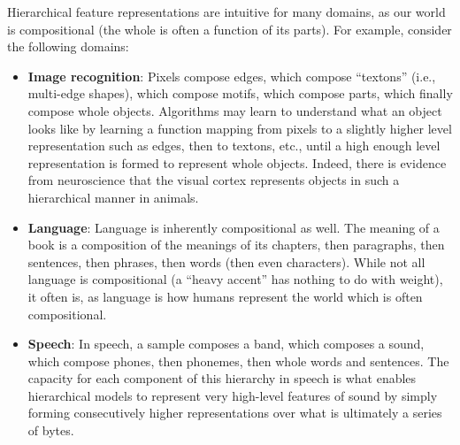 Hierarchical feature representations are intuitive for many domains, as our world is compositional (the whole is often a function of its parts).
For example, consider the following domains:
\begin{itemize}
    \item \textbf{Image recognition}: Pixels compose edges, which compose ``textons'' (i.e., multi-edge shapes), which compose motifs, which compose parts, which finally compose whole objects.
    Algorithms may learn to understand what an object looks like by learning a function mapping from pixels to a slightly higher level representation such as edges, then to textons, etc., until a high enough level representation is formed to represent whole objects.
    Indeed, there is evidence from neuroscience that the visual cortex represents objects in such a hierarchical manner in animals.

    \item \textbf{Language}: Language is inherently compositional as well.
    The meaning of a book is a composition of the meanings of its chapters, then paragraphs, then sentences, then phrases, then words (then even characters).
    While not all language is compositional (a ``heavy accent'' has nothing to do with weight), it often is, as language is how humans represent the world which is often compositional.

    \item \textbf{Speech}: In speech, a sample composes a band, which composes a sound, which compose phones, then phonemes, then whole words and sentences.
    The capacity for each component of this hierarchy in speech is what enables hierarchical models to represent very high-level features of sound by simply forming consecutively higher representations over what is ultimately a series of bytes.
\end{itemize}
